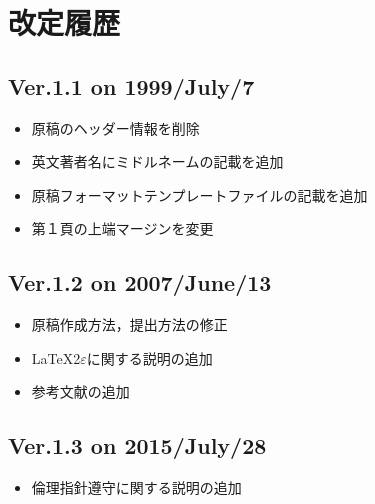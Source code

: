\documentclass{hisken}
\begin{document}
\vspace{15mm}

\section*{改定履歴}
\subsection*{Ver.1.1 on 1999/July/7}
\begin{itemize}
\item 原稿のヘッダー情報を削除
\item 英文著者名にミドルネームの記載を追加
\item 原稿フォーマットテンプレートファイルの記載を追加
\item 第１頁の上端マージンを変更
\end{itemize}

\subsection*{Ver.1.2 on 2007/June/13}
\begin{itemize}
\item 原稿作成方法，提出方法の修正
\item \LaTeX2$\varepsilon$に関する説明の追加
\item 参考文献の追加
\end{itemize}

\subsection*{Ver.1.3 on 2015/July/28}
\begin{itemize}
\item 倫理指針遵守に関する説明の追加
\end{itemize}
\end{document}
